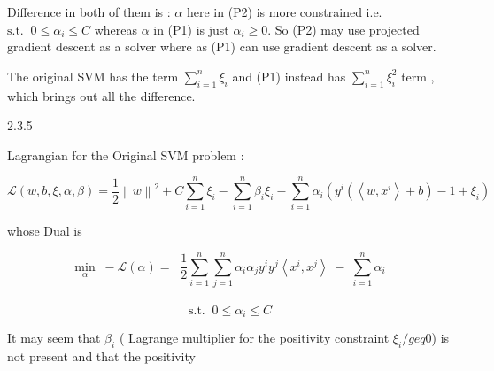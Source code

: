\documentclass[a4paper,11pt]{article}
\begin{document}
\begin{mlsolution}
Difference in both of them is : $\alpha$ here in (P2) is more constrained i.e. $\text{s.t.} \;\;0 \leq \alpha_{i} \leq C$ whereas $\alpha$ in (P1) is just $\alpha_{i} \geq 0$. So (P2) may use projected gradient descent as a solver where as (P1) can use gradient descent as a solver.

The original SVM has the term $\sum_{i=1}^{n}\xi_{i}$ and (P1) instead has $\sum_{i=1}^{n}\xi_{i}^{2}$ term , which brings out all the difference.

2.3.5

Lagrangian for the Original SVM problem : 

\[
\mathcal{L}\left ( w, b, \xi, \alpha, \beta \right ) =
\frac{1}{2} \left \| w \right \|^{2} + C \sum_{i=1}^{n} \xi_{i} - \sum_{i=1}^{n} \beta_{i}\xi_{i} - \sum_{i=1}^{n} \alpha_i\left ( y^{i}\left ( \left \langle w, x^{i} \right \rangle + b \right ) - 1 + \xi_{i} \right )
\]

whose Dual is 

\[
\underset{\alpha}{\text{min}} \;\; - \mathcal{L}\left ( \alpha \right ) = \; \;\frac{1}{2}\sum_{i=1}^{n}\sum_{j=1}^{n}\alpha_{i}\alpha_{j}y^{i}y^{j}\left \langle x^{i}, x^{j} \right \rangle \;-\; \sum_{i=1}^{n}\alpha_{i}
\]\\
\[\text{s.t.} \;\;0 \leq \alpha_{i} \leq C\]

It may seem that $\beta_{i}$ ( Lagrange multiplier for the positivity constraint $\xi_{i} /geq 0$) is not present and that the positivity

\end{mlsolution}

\begin{mlsolution}


\end{mlsolution}
					
\end{document}
